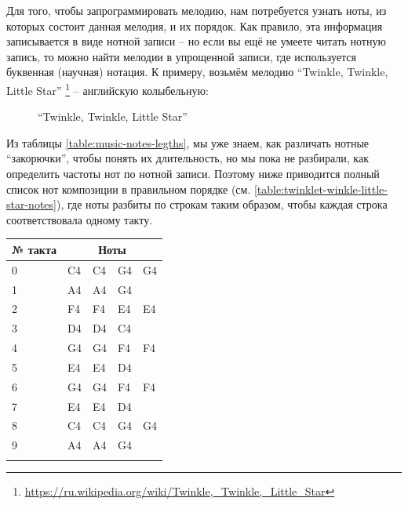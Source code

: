 \documentclass[a4paper,twoside]{book}
\begin{document}
Для того, чтобы запрограммировать мелодию, нам потребуется узнать ноты, из
которых состоит данная мелодия, и их порядок. Как правило, эта информация
записывается в виде нотной записи -- но если вы ещё не умеете читать нотную
запись, то можно найти мелодии в упрощенной записи, где используется буквенная
(научная) нотация. К примеру, возьмём мелодию ``Twinkle, Twinkle, Little
Star'' \footnote{\url{https://ru.wikipedia.org/wiki/Twinkle,_Twinkle,_Little_Star}}
-- английскую колыбельную:

\begin{figure}[ht]
  \caption{``Twinkle, Twinkle, Little Star''}
  \centering
  \label{fig:sound-fig-3}
\end{figure}

Из таблицы \ref{table:music-notes-legths}, мы уже знаем, как различать нотные
``закорючки'', чтобы понять их длительность, но мы пока не разбирали, как
определить частоты нот по нотной записи. Поэтому ниже приводится полный список
нот композиции в правильном порядке (см.
\ref{table:twinklet-winkle-little-star-notes}), где ноты разбиты по строкам
таким образом, чтобы каждая строка соответствовала одному такту.

\begin{tabular}{p{2cm}|p{2cm}|p{2cm}|p{2cm}|p{2cm}}
  № такта & \multicolumn{4}{c}{Ноты} \\
  \hline \hline
  0 & C4 & C4 & G4 & G4 \\
  \hline
  1 & A4 & A4 & G4 & \\
  \hline
  2 & F4 & F4 & E4 & E4 \\
  \hline
  3 & D4 & D4 & C4 & \\
  \hline
  4 & G4 & G4 & F4 & F4 \\
  \hline
  5 & E4 & E4 & D4 & \\
  \hline
  6 & G4 & G4 & F4 & F4 \\
  \hline
  7 & E4 & E4 & D4 & \\
  \hline
  8 & C4 & C4 & G4 & G4 \\
  \hline
  9 & A4 & A4 & G4 & \\
  \hline
  \label{table:twinkle-twinkle-little-star-notes}
\end{tabular}
\end{document}
